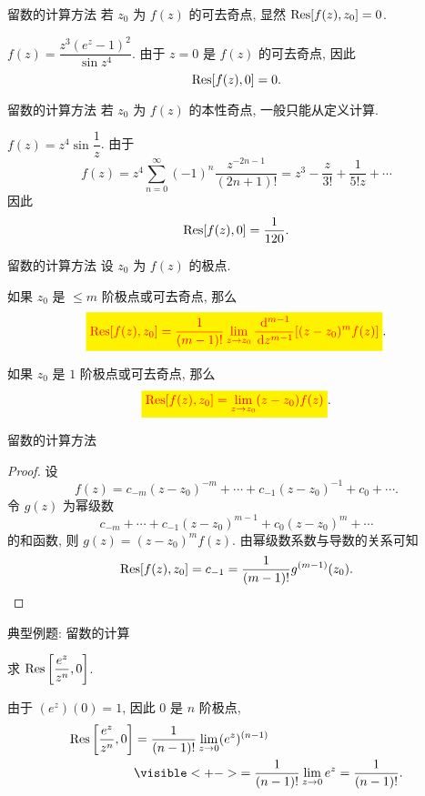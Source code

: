 \begin{frame}{留数的计算方法}
\onslide<+->
若 $z_0$ 为 $f(z)$ 的可去奇点, 显然 ${\mathrm{Res}}[f(z),z_0]=0$.
\begin{example}
$f(z)=\dfrac{z^3(e^z-1)^2}{\sin z^4}$.
\onslide<+->
由于 $z=0$ 是 $f(z)$ 的可去奇点,
\onslide<+->
因此
\[{\mathrm{Res}}[f(z),0]=0.\]
\end{example}
\end{frame}


\begin{frame}{留数的计算方法}
\onslide<+->
若 $z_0$ 为 $f(z)$ 的本性奇点, 一般只能从定义计算.
\begin{example}
$f(z)=z^4\sin\dfrac1z$.
\onslide<+->
由于
\[f(z)=z^4\sum_{n=0}^\infty(-1)^n\frac{z^{-2n-1}}{(2n+1)!}
=z^3-\frac z{3!}+\frac1{5!z}+\cdots\]
\onslide<+->
因此
\[{\mathrm{Res}}[f(z),0]=\frac1{120}.\]
\end{example}
\end{frame}


\begin{frame}{留数的计算方法}
设 $z_0$ 为 $f(z)$ 的极点.
\begin{conclusion}[极点留数计算公式 I]
如果 $z_0$ 是 $\le m$ 阶极点或可去奇点, 那么
\[\eqatt{\Res[f(z),z_0]=\frac1{(m-1)!}\lim_{z\to z_0}\frac{\diff^{m-1}}{\diff z^{m-1}}[(z-z_0)^mf(z)]}.\]
\end{conclusion}

\begin{conclusion}[极点留数计算公式 II]
如果 $z_0$ 是 $1$ 阶极点或可去奇点, 那么
\[\eqatt{\Res[f(z),z_0]=\lim\limits_{z\to z_0}(z-z_0)f(z)}.\]
\end{conclusion}
\end{frame}


\begin{frame}{留数的计算方法}
\begin{proof}
设
\[f(z)=c_{-m}(z-z_0)^{-m}+\cdots+c_{-1}(z-z_0)^{-1}+c_0+\cdots.\]
\onslide<+->
令 $g(z)$ 为幂级数
\[c_{-m}+\cdots+c_{-1}(z-z_0)^{m-1}+c_0(z-z_0)^m+\cdots\]
的和函数, 则 $g(z)=(z-z_0)^mf(z)$.
\onslide<+->
由幂级数系数与导数的关系可知
\[{\mathrm{Res}}[f(z),z_0]=c_{-1}=\dfrac1{(m-1)!}g^{(m-1)}(z_0).\qedhere\]
\end{proof}
\end{frame}


\begin{frame}{典型例题: 留数的计算}
\begin{example}
求 ${\mathrm{Res}}\left[\dfrac{e^z}{z^n},0\right]$.
\end{example}
\begin{solution}
由于 $(e^z)(0)=1$, 因此 $0$ 是 $n$ 阶极点,
\onslide<+->
\begin{align*}
\Res\left[\frac{e^z}{z^n},0\right]&=\frac1{(n-1)!}\lim_{z\to0}(e^z)^{(n-1)}\\
&\visible<+->{=\frac1{(n-1)!}\lim_{z\to0}e^z=\frac1{(n-1)!}.}
\end{align*}
\end{solution}
\end{frame}


